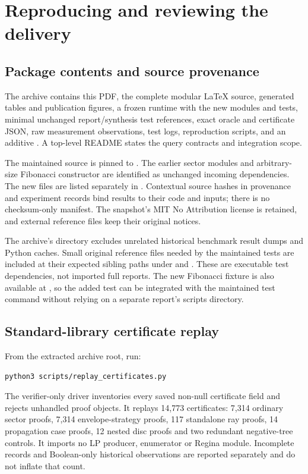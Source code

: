 \section{Reproducing and reviewing the delivery}\label{sec:reproduce}

\subsection{Package contents and source provenance}

The archive contains this PDF, the complete modular \LaTeX{} source, generated tables and publication figures, a frozen  runtime with the new modules and tests, minimal unchanged report/synthesis test references, exact oracle and certificate JSON, raw measurement observations, test logs, reproduction scripts, and an additive . A top-level README states the query contracts and integration scope.

The maintained source is pinned to \baseline. The earlier sector modules and arbitrary-size Fibonacci constructor are identified as unchanged incoming dependencies. The new files are listed separately in . Contextual source hashes in provenance and experiment records bind results to their code and inputs; there is no checksum-only manifest. The snapshot's MIT No Attribution license is retained, and external reference files keep their original notices.

The archive's  directory excludes unrelated historical benchmark result dumps and Python caches. Small original reference files needed by the maintained tests are included at their expected sibling paths under  and . These are executable test dependencies, not imported full reports. The new Fibonacci fixture is also available at , so the added test can be integrated with the maintained test command without relying on a separate report's scripts directory.

\subsection{Standard-library certificate replay}

From the extracted archive root, run:
\begin{lstlisting}[language=bash]
python3 scripts/replay_certificates.py
\end{lstlisting}
The verifier-only driver inventories every saved non-null certificate field and rejects unhandled proof objects. It replays 14,773 certificates: 7,314 ordinary sector proofs, 7,314 envelope-strategy proofs, 117 standalone ray proofs, 14 propagation case proofs, 12 nested disc proofs and two redundant negative-tree controls. It imports no LP producer, enumerator or Regina module. Incomplete records and Boolean-only historical observations are reported separately and do not inflate that count.

